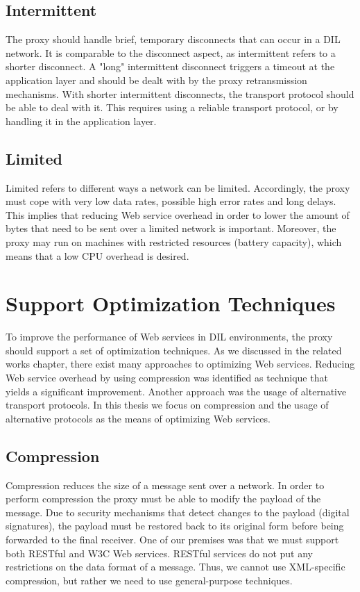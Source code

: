 \subsection{Intermittent}

The proxy should handle brief, temporary disconnects that can occur in a DIL
network. It is comparable to the disconnect aspect, as intermittent refers to a
shorter disconnect. A "long" intermittent disconnect triggers a timeout at the
application layer and should be dealt with by the proxy retransmission
mechanisms. With shorter intermittent disconnects, the transport protocol should
be able to deal with it. This requires using a reliable transport protocol, or
by handling it in the application layer.

\subsection{Limited}

Limited refers to different ways a network can be limited. Accordingly, the
proxy must cope with very low data rates, possible high error rates and long
delays. This implies that reducing Web service overhead in order to lower the
amount of bytes that need to be sent over a limited network is important.
Moreover, the proxy may run on machines with restricted resources (battery
capacity), which means that a low CPU overhead is desired.

\section{Support Optimization Techniques}

To improve the performance of Web services in DIL environments, the proxy should
support a set of optimization techniques. As we discussed in the related works
chapter, there exist many approaches to optimizing Web services. Reducing Web
service overhead by using compression was identified as technique that yields a
significant improvement. Another approach was the usage of alternative transport
protocols. In this thesis we focus on compression and the usage of alternative
protocols as the means of optimizing Web services.

\subsection{Compression}

Compression reduces the size of a message sent over a network. In order to
perform compression the proxy must be able to modify the payload of the message.
Due to security mechanisms that detect changes to the payload (digital
signatures), the payload must be restored back to its original form before being
forwarded to the final receiver. One of our premises was that we must support
both RESTful and W3C Web services. RESTful services do not put any
restrictions on the data format of a message. Thus, we cannot use XML-specific
compression, but rather we need to use general-purpose techniques.

